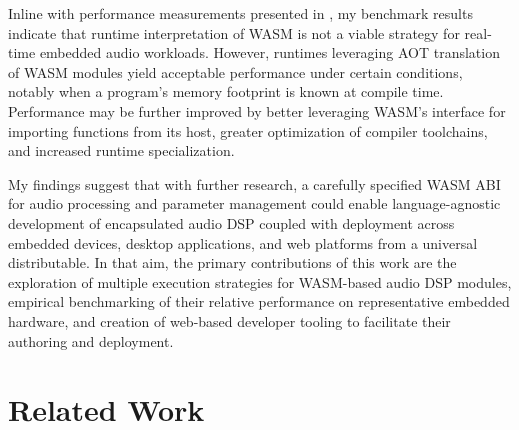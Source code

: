 \documentclass[a4paper]{article}
\begin{document}



Inline with performance measurements presented in \cite{gaster2020audio}, my benchmark results indicate that runtime interpretation of WASM is not a viable strategy for real-time embedded audio workloads. However, runtimes leveraging AOT translation of WASM modules yield acceptable performance under certain conditions, notably when a program's memory footprint is known at compile time. Performance may be further improved by better leveraging WASM's interface for importing functions from its host, greater optimization of compiler toolchains, and increased runtime specialization. 


My findings suggest that with further research, a carefully specified WASM ABI for audio processing and parameter management could enable language-agnostic development of encapsulated audio DSP coupled with deployment across embedded devices, desktop applications, and web platforms from a universal distributable. In that aim, the primary contributions of this work are the exploration of multiple execution strategies for WASM-based audio DSP modules, empirical benchmarking of their relative performance on representative embedded hardware, and creation of web-based developer tooling to facilitate their authoring and deployment.



\section{ Related Work }
\label{ssec:Related Work}

\end{document}
